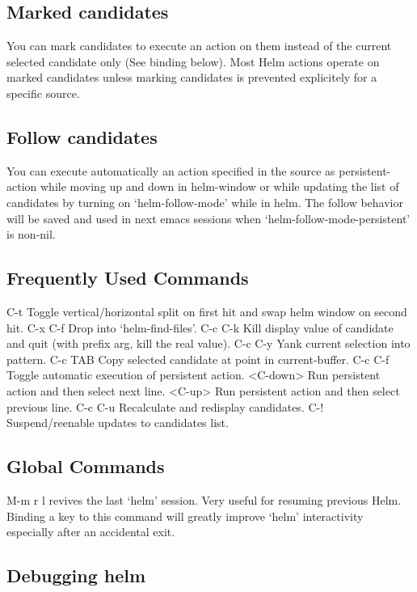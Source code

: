 \documentclass[11pt]{article}
\begin{document}
\subsection{Marked candidates}
\label{sec:org9992a8d}

You can mark candidates to execute an action on them instead
of the current selected candidate only (See binding below).
Most Helm actions operate on marked candidates unless marking candidates
is prevented explicitely for a specific source.

\subsection{Follow candidates}
\label{sec:org0f20f83}

You can execute automatically an action specified in the source as persistent-action
while moving up and down in helm-window or while updating the list of candidates by
turning on ‘helm-follow-mode’ while in helm.
The follow behavior will be saved and used in next emacs sessions when ‘helm-follow-mode-persistent’
is non-nil.

\subsection{Frequently Used Commands}
\label{sec:orga625018}

C-t		Toggle vertical/horizontal split on first hit and swap helm window on second hit.
C-x C-f		Drop into ‘helm-find-files’.
C-c C-k		Kill display value of candidate and quit (with prefix arg, kill the real value).
C-c C-y		Yank current selection into pattern.
C-c TAB		Copy selected candidate at point in current-buffer.
C-c C-f		Toggle automatic execution of persistent action.
<C-down>	Run persistent action and then select next line.
<C-up>		Run persistent action and then select previous line.
C-c C-u		Recalculate and redisplay candidates.
C-!		Suspend/reenable updates to candidates list.

\subsection{Global Commands}
\label{sec:orgbdaff22}

M-m r l revives the last ‘helm’ session.
Very useful for resuming previous Helm. Binding a key to this
command will greatly improve ‘helm’ interactivity especially
after an accidental exit.

\subsection{Debugging helm}
\label{sec:orgb45d447}
\end{document}
